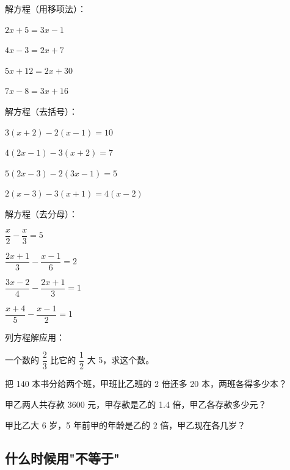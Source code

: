 \begin{exercise}
\item 解方程（用移项法）：
  \begin{subexercise}
    \item $2x+5=3x-1$
    \item $4x-3=2x+7$
    \item $5x+12=2x+30$
    \item $7x-8=3x+16$
  \end{subexercise}

\item 解方程（去括号）：
  \begin{subexercise}
    \item $3(x+2)-2(x-1)=10$
    \item $4(2x-1)-3(x+2)=7$
    \item $5(2x-3)-2(3x-1)=5$
    \item $2(x-3)-3(x+1)=4(x-2)$
  \end{subexercise}

\item 解方程（去分母）：
  \begin{subexercise}
    \item $\dfrac{x}{2}-\dfrac{x}{3}=5$
    \item $\dfrac{2x+1}{3}-\dfrac{x-1}{6}=2$
    \item $\dfrac{3x-2}{4}-\dfrac{2x+1}{3}=1$
    \item $\dfrac{x+4}{5}-\dfrac{x-1}{2}=1$
  \end{subexercise}

\item 列方程解应用：
  \begin{subexercise}
    \item 一个数的 $\dfrac{2}{3}$ 比它的 $\dfrac{1}{2}$ 大 5，求这个数。
    \item 把 140 本书分给两个班，甲班比乙班的 2 倍还多 20 本，两班各得多少本？
    \item 甲乙两人共存款 3600 元，甲存款是乙的 1.4 倍，甲乙各存款多少元？
    \item 甲比乙大 6 岁，5 年前甲的年龄是乙的 2 倍，甲乙现在各几岁？
  \end{subexercise}
\end{exercise}


\subsection*{什么时候用"不等于"}

